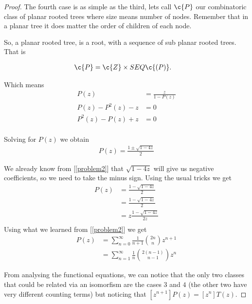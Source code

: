 \begin{proof}
    The fourth case is as simple as the third, lets call $\c{P}$ our combinatoric class of planar rooted trees where size means number
    of nodes. Remember that in a planar tree it does matter the order of children of each node.\pn
    
    So, a planar rooted tree, is a root, with a sequence of sub planar rooted trees. That is
    
    \begin{align}
        \c{P}   &= \c{Z} \times SEQ\c{(P)}. 
    \end{align}\pn
    
    Which means
    \begin{align}
        P(z)               &=  \frac{z}{1 - P(z)}  \\
        P(z) - P^2(z) - z  &=  0                   \\
        P^2(z) - P(z) + z  &=  0                   \\
    \end{align}\pn
    
    Solving for $P(z)$ we obtain
    \begin{align}
        P(z) = \frac{1 \pm \sqrt{ 1 - 4z}}{2}
    \end{align}
    
    We already know from [\ref{problem2}] that $\sqrt{ 1 - 4z}$ will give us negative coefficients, so we need to take the minus sign.
    Using the usual tricks we get
    \begin{align}
       P(z)     &=  \frac{1 - \sqrt{ 1 - 4z}}{2}      \\
                &=  \frac{1 - \sqrt{ 1 - 4z}}{2}      \\
                &=  z \frac{1 - \sqrt{ 1 - 4z}}{2z}   \\
    \end{align}
     Using what we learned from [\ref{problem2}] we get
    \begin{align}
       P(z)     &= \sum_{n = 0}^{\infty} \frac{1}{n+1} \binom{2n}{n} z^{n + 1}    \\
                &= \sum_{n = 1}^{\infty} \frac{1}{n} \binom{2(n-1)}{n-1} z^{n}
    \end{align}
    
    From analysing the functional equations, we can notice that the only two classes that could be related via an isomorfism
    are the cases $3$ and $4$ (the other two have very different counting terms) but noticing that $[z^{n + 1}] P(z) = [z^n] T(z)$.\pn
    

\end{proof}
